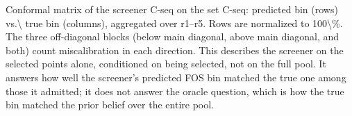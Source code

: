 Conformal matrix of the screener C-seq on the set C-seq: predicted bin (rows) vs.\textbackslash{} true bin (columns), aggregated over r1--r5. Rows are normalized to 100\textbackslash{}\%. The three off-diagonal blocks (below main diagonal, above main diagonal, and both) count miscalibration in each direction. This describes the screener on the selected points alone, conditioned on being selected, not on the full pool. It answers how well the screener's predicted FOS bin matched the true one among those it admitted; it does not answer the oracle question, which is how the true bin matched the prior belief over the entire pool.
